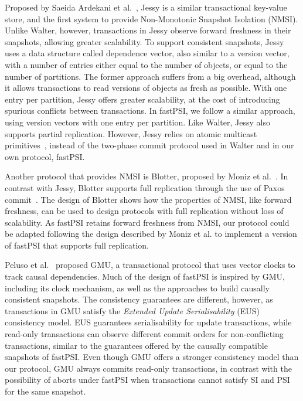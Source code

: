 Proposed by Saeida Ardekani et al.~\citep{ardekani_nmsi}, Jessy is a similar transactional key-value store, and the first system to provide Non-Monotonic Snapshot Isolation (NMSI). Unlike Walter, however, transactions in Jessy observe forward freshness in their snapshots, allowing greater scalability. To support consistent snapshots, Jessy uses a data structure called dependence vector, also similar to a version vector, with a number of entries either equal to the number of objects, or equal to the number of partitions. The former approach suffers from a big overhead, although it allows transactions to read versions of objects as fresh as possible. With one entry per partition, Jessy offers greater scalability, at the cost of introducing spurious conflicts between transactions. In fastPSI, we follow a similar approach, using version vectors with one entry per partition. Like Walter, Jessy also supports partial replication. However, Jessy relies on atomic multicast primitives~\citep{guerraoui_multicast}, instead of the two-phase commit protocol used in Walter and in our own protocol, fastPSI.

Another protocol that provides NMSI is Blotter, proposed by Moniz et al.~\citep{moniz_blotter}. In contrast with Jessy, Blotter supports full replication through the use of Paxos commit~\citep{gray_paxos_commit}. The design of Blotter shows how the properties of NMSI, like forward freshness, can be used to design protocols with full replication without loss of scalability. As fastPSI retains forward freshness from NMSI, our protocol could be adapted following the design described by Moniz et al. to implement a version of fastPSI that supports full replication.

Peluso et al.~\citep{peluso_gmu} proposed GMU, a transactional protocol that uses vector clocks to track causal dependencies. Much of the design of fastPSI is inspired by GMU, including its clock mechanism, as well as the approaches to build causally consistent snapshots. The consistency guarantees are different, however, as transactions in GMU satisfy the \emph{Extended Update Serialisability} (EUS)~\citep{hansdah_update_ser, adya_thesis} consistency model. EUS guarantees serialisability for update transactions, while read-only transactions can observe different commit orders for non-conflicting transactions, similar to the guarantees offered by the causally compatible snapshots of fastPSI. Even though GMU offers a stronger consistency model than our protocol, GMU always commits read-only transactions, in contrast with the possibility of aborts under fastPSI when transactions cannot satisfy SI and PSI for the same snapshot.
